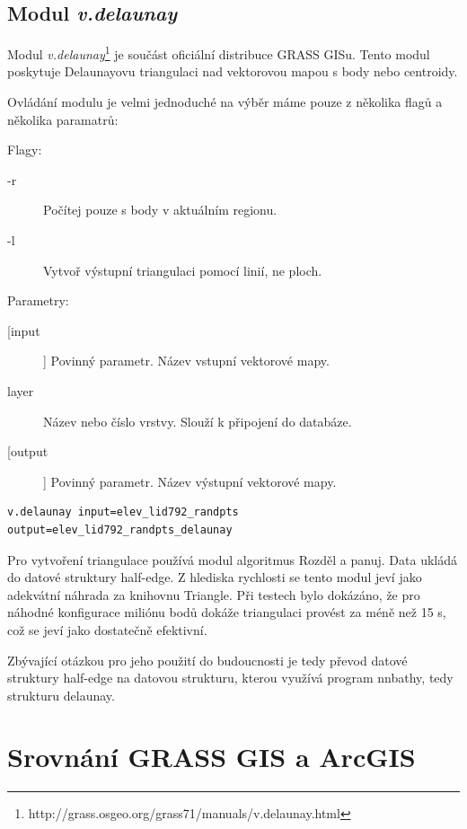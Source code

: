 \documentclass[12pt,a4paper]{article}
\begin{document}
\newpage
\subsection{Modul \emph{v.delaunay}}
\label{chap:v.delaunay}
Modul \emph{v.delaunay}\footnote{http://grass.osgeo.org/grass71/manuals/v.delaunay.html} je součást oficiální distribuce GRASS GISu. Tento modul poskytuje Delaunayovu triangulaci nad vektorovou mapou s body nebo centroidy. 

Ovládání modulu je velmi jednoduché na výběr máme pouze z několika flagů a několika paramatrů:

\bigskip
Flagy:
\begin{description}
\item[-r] Počítej pouze s body v aktuálním regionu.
\item[-l] Vytvoř výstupní triangulaci pomocí linií, ne ploch.
\end{description}
\bigskip
Parametry:
\begin{description}
\item[[input]] Povinný parametr. Název vstupní vektorové mapy.
\item[layer] Název nebo číslo vrstvy. Slouží k připojení do databáze.
\item[[output]] Povinný parametr. Název výstupní vektorové mapy.
\end{description}

\begin{lstlisting}[caption={Volání modulu v.delaunay z příkazové řádky}]
v.delaunay input=elev_lid792_randpts output=elev_lid792_randpts_delaunay
\end{lstlisting}


Pro vytvoření triangulace používá modul algoritmus Rozděl a panuj. Data ukládá do datové struktury half-edge. Z hlediska rychlosti se tento modul jeví jako adekvátní náhrada za knihovnu Triangle. Při testech bylo dokázáno, že pro náhodné konfigurace miliónu bodů dokáže triangulaci provést za méně než 15 s, což se jeví jako dostatečně efektivní.

Zbývající otázkou pro jeho použití do budoucnosti je tedy převod datové struktury half-edge na datovou strukturu, kterou využívá program nnbathy, tedy strukturu delaunay.


\newpage
\section{Srovnání GRASS GIS a ArcGIS}
\end{document}
